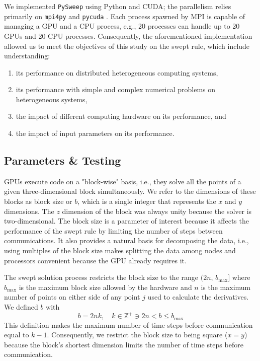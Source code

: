 \documentclass[preprints,article,accept,moreauthors,pdftex]{Definitions/mdpi}
\def\pysweep{\texttt{PySweep}}
\begin{document}
\par
We implemented \pysweep{} using Python and CUDA; the parallelism relies primarily on \texttt{mpi4py} \cite{DalcinMPIPython} and \texttt{pycuda} \cite{KlocknerPyCUDAGeneration}. Each process spawned by MPI is capable of managing a GPU and a CPU process, e.g., 20 processes can handle up to 20 GPUs and 20 CPU processes. Consequently, the aforementioned implementation allowed us to meet the objectives of this study on the swept rule, which include understanding:
\begin{enumerate}
    \item its performance on distributed heterogeneous computing systems,
    \item its performance with simple and complex numerical problems on heterogeneous systems,
    \item the impact of different computing hardware on its performance, and
    \item the impact of input parameters on its performance.
\end{enumerate}

\subsection{Parameters \& Testing}
\label{parameters-section}

GPUs execute code on a "block-wise" basis, i.e., they solve all the points of a given three-dimensional block simultaneously. We refer to the dimensions of these blocks as block size or $b$, which is a single integer that represents the $x$ and $y$ dimensions. The $z$ dimension of the block was always unity because the solver is two-dimensional. The block size is a parameter of interest because it affects the performance of the swept rule by limiting the number of steps between communications. It also provides a natural basis for decomposing the data, i.e., using multiples of the block size makes splitting the data among nodes and processors convenient because the GPU already requires it.

\par 
The swept solution process restricts the block size to the range $(2n,\,b_{\max}]$ where $b_{\max}$ is the maximum block size allowed by the hardware and $n$ is the maximum number of points on either side of any point $j$ used to calculate the derivatives. We defined $b$ with
\begin{equation}
    \label{blocksize-equation}
    b  = 2nk,\quad k\in\mathbb{Z}^{+}\ni 2n < b \leq b_{\max}
\end{equation}
This definition makes the maximum number of time steps before communication equal to $k-1$. Consequently, we restrict the block size to being square ($x=y$) because the block's shortest dimension limits the number of time steps before communication. 
\end{document}
